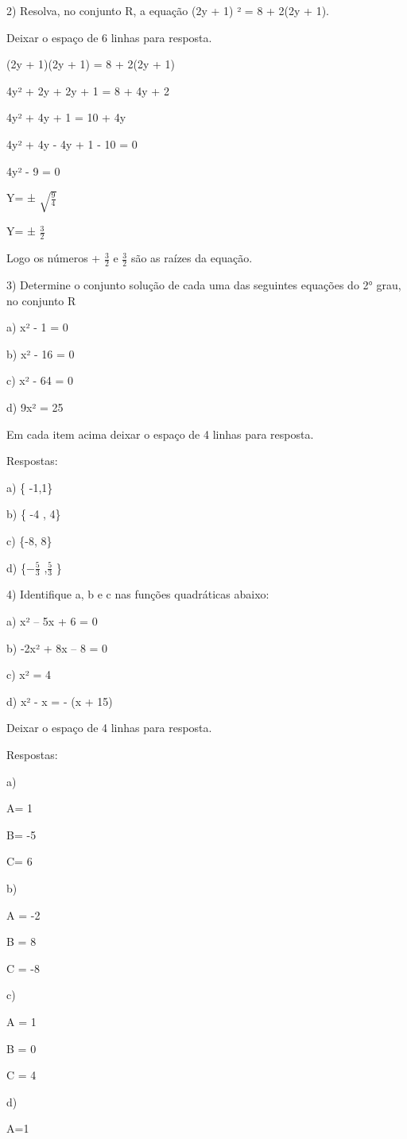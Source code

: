 {2) Resolva, no conjunto R, a equação (2y + 1) ² = 8 + 2(2y + 1).

Deixar o espaço de 6 linhas para resposta.

(2y + 1)(2y + 1) = 8 + 2(2y + 1)

4y² + 2y + 2y + 1 = 8 + 4y + 2

4y² + 4y + 1 = 10 + 4y

4y² + 4y - 4y + 1 - 10 = 0

4y² - 9 = 0

Y= ± \(\sqrt{\frac{9}{4}}\)

Y= ± \(\frac{3}{2}\)

Logo os números + \(\frac{3}{2}\) e \(\frac{3}{2}\) são as raízes da
equação.

3) Determine o conjunto solução de cada uma das seguintes equações do 2°
grau, no conjunto R

a) x² - 1 = 0

b) x² - 16 = 0

c) x² - 64 = 0

d) 9x² = 25

Em cada item acima deixar o espaço de 4 linhas para resposta.

Respostas:

a) \{ -1,1\}

b) \{ -4 , 4\}

c) \{-8, 8\}

d) \{\(- \frac{5}{3}\) ,\(\frac{5}{3}\) \}

4) Identifique a, b e c nas funções quadráticas abaixo:

a) x² -- 5x + 6 = 0

b) -2x² + 8x -- 8 = 0

c) x² = 4

d) x² - x = - (x + 15)

Deixar o espaço de 4 linhas para resposta.

Respostas:

a)

A= 1

B= -5

C= 6

b)

A = -2

B = 8

C = -8

c)

A = 1

B = 0

C = 4

d)

A=1

}
